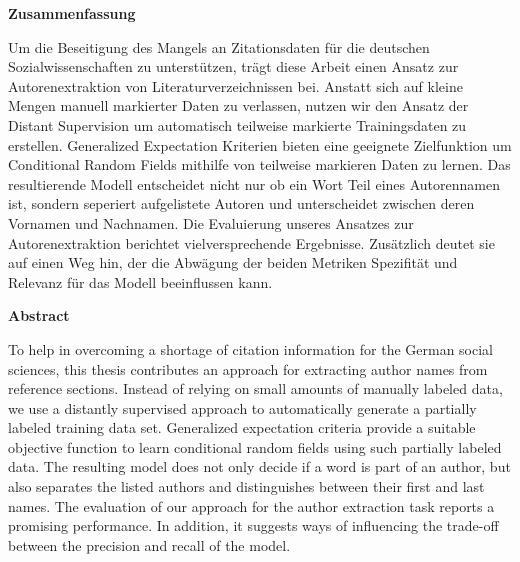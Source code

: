 \begin{center}
  \begin{large}
  \bfseries{Zusammenfassung}
  \end{large}
\end{center}
Um die Beseitigung des Mangels an Zitationsdaten f\"{u}r die deutschen Sozialwissenschaften zu unterst\"{u}tzen, trägt diese Arbeit einen Ansatz zur Autorenextraktion von Literaturverzeichnissen bei.
Anstatt sich auf kleine Mengen manuell markierter Daten zu verlassen, nutzen wir den Ansatz der Distant Supervision um automatisch teilweise markierte Trainingsdaten zu erstellen.
Generalized Expectation Kriterien bieten eine geeignete Zielfunktion um Conditional Random Fields mithilfe von teilweise markieren Daten zu lernen.
Das resultierende Modell entscheidet nicht nur ob ein Wort Teil eines Autorennamen ist, sondern seperiert aufgelistete Autoren und unterscheidet zwischen deren Vornamen und Nachnamen.
Die Evaluierung unseres Ansatzes zur Autorenextraktion berichtet vielversprechende Ergebnisse.
Zus\"{a}tzlich deutet sie auf einen Weg hin, der die Abw\"{a}gung der beiden Metriken Spezifität und Relevanz f\"{u}r das Modell beeinflussen kann.
\par\bigskip
\par\bigskip
{}
\begin{center}
  \begin{large}
  \bfseries{Abstract}
  \end{large}
\end{center}
To help in overcoming a shortage of citation information for the German social sciences, this thesis contributes an approach for extracting author names from reference sections.
Instead of relying on small amounts of manually labeled data, we use a distantly supervised approach to automatically generate a partially labeled training data set.
Generalized expectation criteria provide a suitable objective function to learn conditional random fields using such partially labeled data.
The resulting model does not only decide if a word is part of an author, but also separates the listed authors and distinguishes between their first and last names.
The evaluation of our approach for the author extraction task reports a promising performance.
In addition, it suggests ways of influencing the trade-off between the precision and recall of the model.
